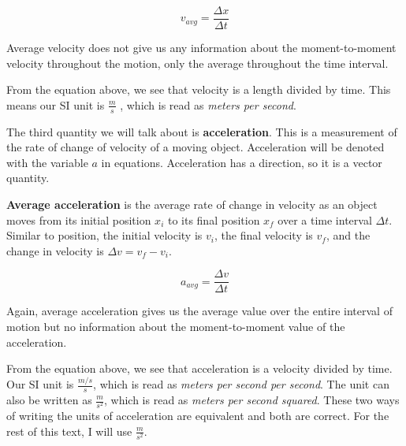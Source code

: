 \documentclass[12pt]{book}
\begin{document}
\begin{equation}
v_{avg} = \frac{\Delta x}{\Delta t}
\end{equation}

Average velocity does not give us any information about the moment-to-moment velocity throughout the motion, only the average throughout the time interval.

From the equation above, we see that velocity is a length divided by time. This means our SI unit is $\frac{m}{s}$ , which is read as \textit{meters per second}. 

The third quantity we will talk about is \textbf{acceleration}. This is a measurement of the rate of change of velocity of a moving object. Acceleration will be denoted with the variable $a$ in equations. Acceleration has a direction, so it is a vector quantity. 

\textbf{Average acceleration} is the average rate of change in velocity as an object moves from its initial position $x_i$ to its final position $x_f$ over a time interval $\Delta t$. Similar to position, the initial velocity is $v_i$, the final velocity is $v_f$, and the change in velocity is $\Delta v = v_f - v_i$.

\begin{equation}
a_{avg} = \frac{\Delta v}{\Delta t}
\end{equation}

Again, average acceleration gives us the average value over the entire interval of motion but no information about the moment-to-moment value of the acceleration.

From the equation above, we see that acceleration is a velocity divided by time. Our SI unit is $\frac{m/s}{s}$, which is read as \textit{meters per second per second}. The unit can also be written as $\frac{m}{s^2}$, which is read as \textit{meters per second squared}. These two ways of writing the units of acceleration are equivalent and both are correct. For the rest of this text, I will use $\frac{m}{s^2}$.
\end{document}
